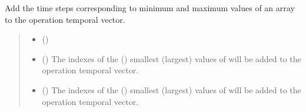 \documentclass[letterpaper,10pt,english]{sphinxmanual}
\begin{document}
\begin{fulllineitems}
\begin{fulllineitems}
\label{\detokenize{generated/tamos.TimeSettings:tamos.TimeSettings.add_extreme_values}}
\pysigstartsignatures
{}
\pysigstopsignatures
\sphinxAtStartPar
Add the time steps corresponding to minimum and maximum values of an array to the operation temporal vector.
\begin{quote}\begin{description}
\begin{itemize}
\item {} 
\sphinxAtStartPar
{} () \textendash{} 

\item {} 
\sphinxAtStartPar
{} (\sphinxstyleliteralemphasis{\sphinxupquote{, }}) \textendash{} The indexes of the  () smallest (largest) values of 
will be added to the operation temporal vector.

\item {} 
\sphinxAtStartPar
{} (\sphinxstyleliteralemphasis{\sphinxupquote{, }}) \textendash{} The indexes of the  () smallest (largest) values of 
will be added to the operation temporal vector.

\end{itemize}

\end{description}\end{quote}

\end{fulllineitems}



\end{fulllineitems}
\end{document}
